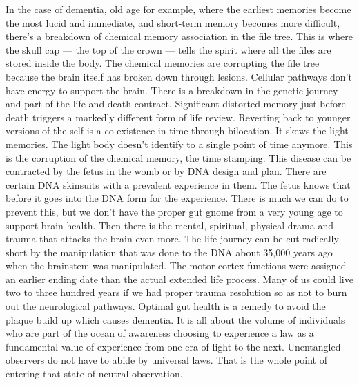 \documentclass[letterpaper,11pt,twoside,titlepage,onecolumn,openany]{book}
\begin{document}
In the case of dementia, old age for example, where the earliest
memories become the most lucid and immediate, and short-term memory
becomes more difficult, there's a breakdown of chemical memory
association in the file tree. This is where the skull cap --- the top of
the crown --- tells the spirit where all the files are stored inside the
body. The chemical memories are corrupting the file tree because the
brain itself has broken down through lesions. Cellular pathways don't
have energy to support the brain. There is a breakdown in the genetic
journey and part of the life and death contract. Significant distorted
memory just before death triggers a markedly different form of life
review. Reverting back to younger versions of the self is a co-existence
in time through bilocation. It skews the light memories. The light body
doesn't identify to a single point of time anymore. This is the
corruption of the chemical memory, the time stamping. This disease can
be contracted by the fetus in the womb or by DNA design and plan. There
are certain DNA skinsuits with a prevalent experience in them. The fetus
knows that before it goes into the DNA form for the experience. There is
much we can do to prevent this, but we don't have the proper gut gnome
from a very young age to support brain health. Then there is the mental,
spiritual, physical drama and trauma that attacks the brain even more.
The life journey can be cut radically short by the manipulation that was
done to the DNA about 35,000 years ago when the brainstem was
manipulated. The motor cortex functions were assigned an earlier ending
date than the actual extended life process. Many of us could live two to
three hundred years if we had proper trauma resolution so as not to burn
out the neurological pathways. Optimal gut health is a remedy to avoid
the plaque build up which causes dementia. It is all about the volume of
individuals who are part of the ocean of awareness choosing to
experience a law as a fundamental value of experience from one era of
light to the next. Unentangled observers do not have to abide by
universal laws. That is the whole point of entering that state of
neutral observation.
\end{document}
